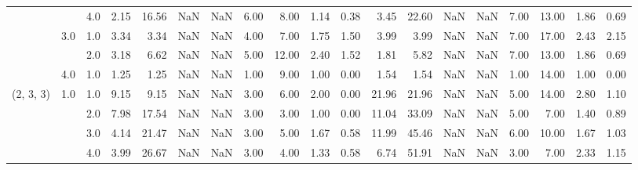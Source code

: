 \begin{tabular}{lllrrrrrrrrrrrrrrrr}
          &     & 4.0  &      2.15 &      16.56 &               NaN &                NaN &  6.00 &   8.00 &             1.14 &                         0.38 &      3.45 &      22.60 &               NaN &                NaN &  7.00 &  13.00 &             1.86 &                         0.69 \\
          & 3.0 & 1.0  &      3.34 &       3.34 &               NaN &                NaN &  4.00 &   7.00 &             1.75 &                         1.50 &      3.99 &       3.99 &               NaN &                NaN &  7.00 &  17.00 &             2.43 &                         2.15 \\
          &     & 2.0  &      3.18 &       6.62 &               NaN &                NaN &  5.00 &  12.00 &             2.40 &                         1.52 &      1.81 &       5.82 &               NaN &                NaN &  7.00 &  13.00 &             1.86 &                         0.69 \\
          & 4.0 & 1.0  &      1.25 &       1.25 &               NaN &                NaN &  1.00 &   9.00 &             1.00 &                         0.00 &      1.54 &       1.54 &               NaN &                NaN &  1.00 &  14.00 &             1.00 &                         0.00 \\
(2, 3, 3) & 1.0 & 1.0  &      9.15 &       9.15 &               NaN &                NaN &  3.00 &   6.00 &             2.00 &                         0.00 &     21.96 &      21.96 &               NaN &                NaN &  5.00 &  14.00 &             2.80 &                         1.10 \\
          &     & 2.0  &      7.98 &      17.54 &               NaN &                NaN &  3.00 &   3.00 &             1.00 &                         0.00 &     11.04 &      33.09 &               NaN &                NaN &  5.00 &   7.00 &             1.40 &                         0.89 \\
          &     & 3.0  &      4.14 &      21.47 &               NaN &                NaN &  3.00 &   5.00 &             1.67 &                         0.58 &     11.99 &      45.46 &               NaN &                NaN &  6.00 &  10.00 &             1.67 &                         1.03 \\
          &     & 4.0  &      3.99 &      26.67 &               NaN &                NaN &  3.00 &   4.00 &             1.33 &                         0.58 &      6.74 &      51.91 &               NaN &                NaN &  3.00 &   7.00 &             2.33 &                         1.15 \\

\end{tabular}
